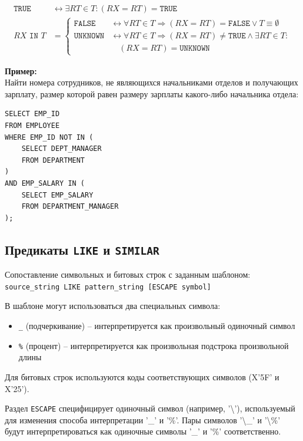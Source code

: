 \documentclass[a4paper,12pt]{article}
\begin{document}
\begin{flushleft}
\[
\begin{aligned}
\texttt{TRUE} &\leftrightarrow \exists RT \in T: (RX = RT) = \texttt{TRUE} \\[6pt]
RX \texttt{ IN } T &= 
\begin{cases}
\texttt{FALSE} &\leftrightarrow \forall RT \in T \Rightarrow (RX = RT) = \texttt{FALSE} \lor T \equiv \emptyset \\
\texttt{UNKNOWN} &\leftrightarrow \forall RT \in T \Rightarrow (RX = RT) \neq \texttt{TRUE} \land \exists RT \in T: \\
&\quad (RX = RT) = \texttt{UNKNOWN}
\end{cases}
\end{aligned}
\]
\end{flushleft}

\textbf{Пример:}\\
Найти номера сотрудников, не являющихся начальниками отделов и получающих зарплату, размер которой равен размеру зарплаты какого-либо начальника отдела:
\begin{lstlisting}
SELECT EMP_ID 
FROM EMPLOYEE 
WHERE EMP_ID NOT IN (
    SELECT DEPT_MANAGER 
    FROM DEPARTMENT
) 
AND EMP_SALARY IN (
    SELECT EMP_SALARY 
    FROM DEPARTMENT_MANAGER
);
\end{lstlisting}

\subsection{Предикаты \texttt{LIKE} и \texttt{SIMILAR}}

Сопоставление символьных и битовых строк с заданным шаблоном:
\texttt{source\_string LIKE pattern\_string [ESCAPE symbol]}

В шаблоне могут использоваться два специальных символа:
\begin{itemize}
    \item \texttt{\_} (подчеркивание) – интерпретируется как произвольный одиночный символ
    \item \texttt{\%} (процент) – интерпретируется как произвольная подстрока произвольной длины
\end{itemize}

Для битовых строк используются коды соответствующих символов (X'5F' и X'25').

Раздел \texttt{ESCAPE} специфицирует одиночный символ (например, '\textbackslash'), используемый для изменения способа интерпретации '\_' и '\%'. Пары символов '\textbackslash\_' и '\textbackslash\%' будут интерпретироваться как одиночные символы '\_' и '\%' соответственно.
\end{document}

